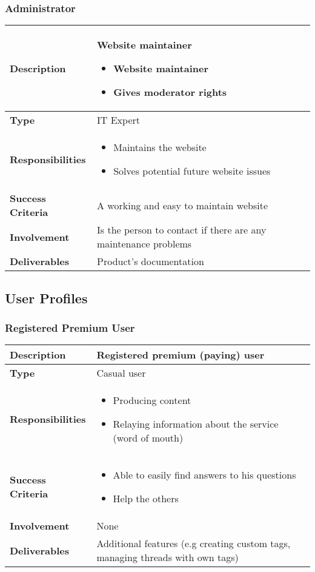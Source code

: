 \documentclass [a4paper, 11pt]{article}
\begin{document}
\subsubsection{Administrator}
\begin{tabular}{| >{\bfseries} M{85pt} | M{250pt} |}
	\hline
	Description & Website maintainer
	\begin{itemize}
		\item Website maintainer
		\item Gives moderator rights
	\end{itemize} \tabularnewline
	\hline
	Type & IT Expert \tabularnewline
	\hline
	Responsibilities &
	\begin{itemize}
		\item Maintains the website
		\item Solves potential future website issues
	\end{itemize} \tabularnewline
	\hline
	Success Criteria & A working and easy to maintain website \tabularnewline
	\hline
	Involvement & Is the person to contact if there are any maintenance problems \tabularnewline
	\hline
	Deliverables & Product's documentation \tabularnewline
	\hline
\end{tabular}

\subsection{User Profiles}
\subsubsection{Registered Premium User}
\begin{tabular}{| >{\bfseries} M{85pt} | M{250pt} |}
	\hline
	Description & Registered premium (paying) user \tabularnewline
	\hline
	Type & Casual user \tabularnewline
	\hline
	Responsibilities &
	\begin{itemize}
		\item Producing content
		\item Relaying information about the service (word of mouth)
	\end{itemize} \tabularnewline
	\hline
	Success Criteria &
	\begin{itemize}
		\item Able to easily find answers to his questions
		\item Help the others
	\end{itemize} \tabularnewline
	\hline
	Involvement & None \tabularnewline
	\hline
	Deliverables & Additional features (e.g creating custom tags, managing threads with own tags) \tabularnewline
	\hline
\end{tabular}
\end{document}
